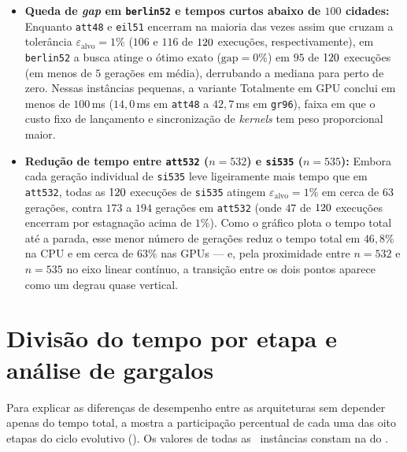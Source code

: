 \begin{itemize}
  \item
        \textbf{Queda de \emph{gap} em \texttt{berlin52} e tempos curtos abaixo de \(100\) cidades:} Enquanto \texttt{att48} e \texttt{eil51} encerram na maioria das vezes assim que cruzam a tolerância \(\varepsilon_{\text{alvo}} = 1\%\) (\(106\) e \(116\) de \(120\) execuções, respectivamente), em \texttt{berlin52} a busca atinge o ótimo exato (\(\text{gap} = 0\%\)) em \(95\) de \(120\) execuções (em menos de \(5\) gerações em média), derrubando a mediana para perto de zero. Nessas instâncias pequenas, a variante Totalmente em GPU conclui em menos de \(100\)\,ms (\(14{,}0\)\,ms em \texttt{att48} a \(42{,}7\)\,ms em \texttt{gr96}), faixa em que o custo fixo de lançamento e sincronização de \emph{kernels} tem peso proporcional maior.
  \item
        \textbf{Redução de tempo entre \texttt{att532} (\(n = 532\)) e \texttt{si535} (\(n = 535\)):} Embora cada geração individual de \texttt{si535} leve ligeiramente mais tempo que em \texttt{att532}, todas as \(120\) execuções de \texttt{si535} atingem \(\varepsilon_{\text{alvo}} = 1\%\) em cerca de \(63\) gerações, contra \(173\) a \(194\) gerações em \texttt{att532} (onde \(47\) de \(120\) execuções encerram por estagnação acima de \(1\%\)). Como o gráfico plota o tempo total até a parada, esse menor número de gerações reduz o tempo total em \(46{,}8\%\) na CPU e em cerca de \(63\%\) nas GPUs --- e, pela proximidade entre \(n = 532\) e \(n = 535\) no eixo linear contínuo, a transição entre os dois pontos aparece como um degrau quase vertical.
\end{itemize}

\section{Divisão do tempo por etapa e análise de gargalos}\label{sec-44-decomposicao-fases}

Para explicar as diferenças de desempenho entre as arquiteturas sem depender apenas do tempo total, a  mostra a participação percentual de cada uma das oito etapas do ciclo evolutivo (). Os valores de todas as \totalinstancias\ instâncias constam na  do .

